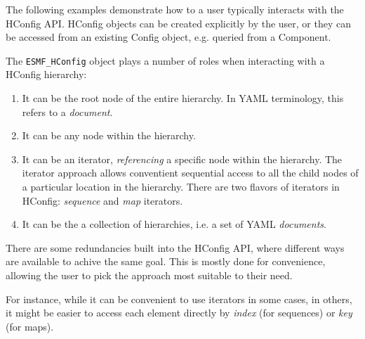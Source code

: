 
The following examples demonstrate how to a user typically interacts with the
HConfig API. HConfig objects can be created explicitly by the user, or they
can be accessed from an existing Config object, e.g. queried from a Component.

The {\tt ESMF\_HConfig} object plays a number of roles when interacting with
a HConfig hierarchy:
\begin{enumerate}
\item It can be the root node of the entire hierarchy. In YAML terminology, this
refers to a {\em document}.
\item It can be any node within the hierarchy.
\item It can be an iterator, {\em referencing} a specific node within the
hierarchy. The iterator approach allows conventient sequential access to all
the child nodes of a particular location in the hierarchy. There are two flavors
of iterators in HConfig: {\em sequence} and {\em map} iterators.
\item It can be the a collection of hierarchies, i.e. a set of YAML {\em documents}.
\end{enumerate}

There are some redundancies built into the HConfig API, where different ways
are available to achive the same goal. This is mostly done for convenience,
allowing the user to pick the approach most suitable to their need.

For instance, while it can be convenient to use iterators in some cases, in
others, it might be easier to access each element directly by {\em index}
(for sequences) or {\em key} (for maps).
